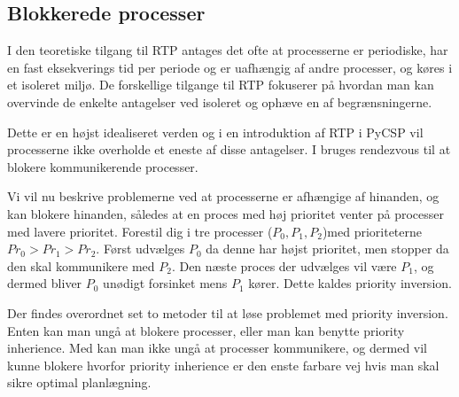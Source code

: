 \begin{shaded}
\subsection{Blokkerede processer}
I den teoretiske tilgang til RTP antages det ofte at processerne er periodiske, har en fast eksekverings tid per periode og er uafhængig af andre processer, og køres i et isoleret miljø. De forskellige tilgange til RTP fokuserer på hvordan man kan overvinde de enkelte antagelser ved isoleret og ophæve en af begrænsningerne. 


Dette er en højst idealiseret verden og i en introduktion af RTP i PyCSP vil processerne ikke overholde et eneste af disse antagelser. 
I \pycsp bruges rendezvous til at blokere kommunikerende processer.

Vi vil nu beskrive problemerne ved at processerne er afhængige af hinanden, og kan blokere hinanden, således at en proces med høj prioritet venter på processer med lavere prioritet. Forestil dig i \pycsp tre processer ($P_0,P_1,P_2$)med prioriteterne $Pr_0>Pr_1>Pr_2$. Først udvælges $P_0$ da denne har højst prioritet, men stopper da den skal kommunikere med $P_2$. Den næste proces der udvælges vil være $P_1$, og dermed bliver $P_0$ unødigt forsinket mens $P_1$ kører. Dette kaldes priority inversion\cite{sha1990priority}.

Der findes overordnet set to metoder til at løse problemet med priority inversion. Enten kan man ungå at blokere processer, eller man kan benytte priority inherience\cite{sha1990priority}. Med \pycsp kan man ikke ungå at processer kommunikere, og dermed vil kunne blokere hvorfor priority inherience er den enste farbare vej hvis man skal sikre optimal planlægning.
\end{shaded}


